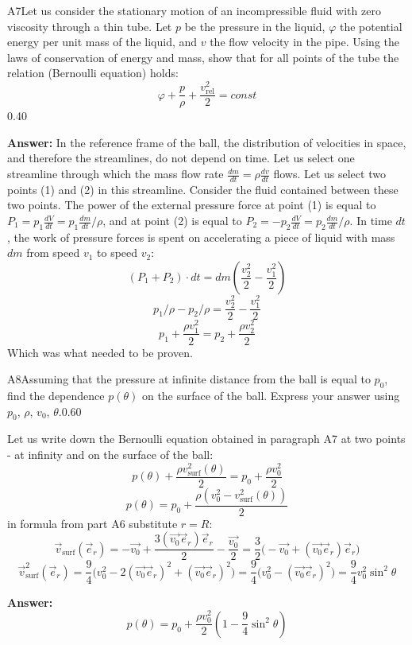 \documentclass[11pt,a4paper]{article}
\begin{document}
\begin{solcard}{A7}{Let us consider the stationary motion of an incompressible fluid with zero viscosity through a thin tube. Let $p$ be the pressure in the liquid, $\varphi$ the potential energy per unit mass of the liquid, and $v$ the flow velocity in the pipe. Using the laws of conservation of energy and mass, show that for all points of the tube the relation (Bernoulli equation) holds: $$\varphi  + \frac{p}{\rho} + \frac{ v_\text{rel}^2}{2} = const$$}{0.40}
\par\smallskip\noindent\textbf{Answer:} In the reference frame of the ball, the distribution of velocities in space, and therefore the streamlines, do not depend on time. Let us select one streamline through which the mass flow rate $\frac{dm}{dt} = \rho \frac{dv}{dt}$ flows. Let us select two points (1) and (2) in this streamline. Consider the fluid contained between these two points. The power of the external pressure force at point (1) is equal to $P_1 = p_1 \frac{dV}{dt} = p_1  \frac{dm}{dt} / \rho $, and at point (2) is equal to $P_2 = - p_2 \frac{dV}{dt} = p_2  \frac{dm}{dt} / \rho $. In time $dt$, the work of pressure forces is spent on accelerating a piece of liquid with mass $dm$ from speed $v_1$ to speed $v_2$: $$(P_1 + P_2)\cdot dt = dm (\frac{v_2^2}{2} - \frac{v_1^2}{2})$$ $$p_1/ \rho - p_2 / \rho = \frac{v_2^2}{2} - \frac{v_1^2}{2}$$$$p_1 + \frac{\rho v_1^2}{2} = p_2 + \frac{\rho v_2^2}{2}$$Which was what needed to be proven.
\end{solcard}

\begin{solcard}{A8}{Assuming that the pressure at infinite distance from the ball is equal to $p_0$, find the dependence $p(\theta)$ on the surface of the ball. Express your answer using $p_0$, $\rho$, $v_0$, $\theta$.}{0.60}

Let us write down the Bernoulli equation obtained in paragraph A7 at two points - at infinity and on the surface of the ball: $$p(\theta) + \frac{\rho v^2_{\text{surf}}(\theta)}{2} =p_{0} + \frac{\rho v^2_{0}}{2} $$ $$p(\theta)  =p_{0} + \frac{\rho ( v^2_{0} - v^2_{\text{surf}}(\theta))}{2} $$in formula from part A6 substitute $r = R$: $$\vec{v}_{\text{surf}}(\vec{e}_r) = -\vec{v_0}+\frac{3(\vec{v_0}\vec{e}_r)\vec{e}_r}{2}-\frac{\vec{v_0}}{2} = \frac{3}{2} \big( -\vec{v_0}+(\vec{v_0}\vec{e}_r)\vec{e}_r\big)$$$$\vec{v}^2_{\text{surf}}(\vec{e}_r) = \frac{9}{4}\big(v_0^2 - 2(\vec{v_0}\vec{e}_r)^2 + (\vec{v_0}\vec{e}_r)^2 \big) = \frac{9}{4}\big(v_0^2 - (\vec{v_0}\vec{e}_r)^2 \big) = \frac{9}{4}v_0^2 \sin^2{\theta} $$

\par\smallskip\noindent\textbf{Answer:} $$p(\theta) = p_0 + \frac{\rho v_0^2}{2} (1 - \frac{9}{4}\sin^2{\theta})$$
\end{solcard}
\end{document}

